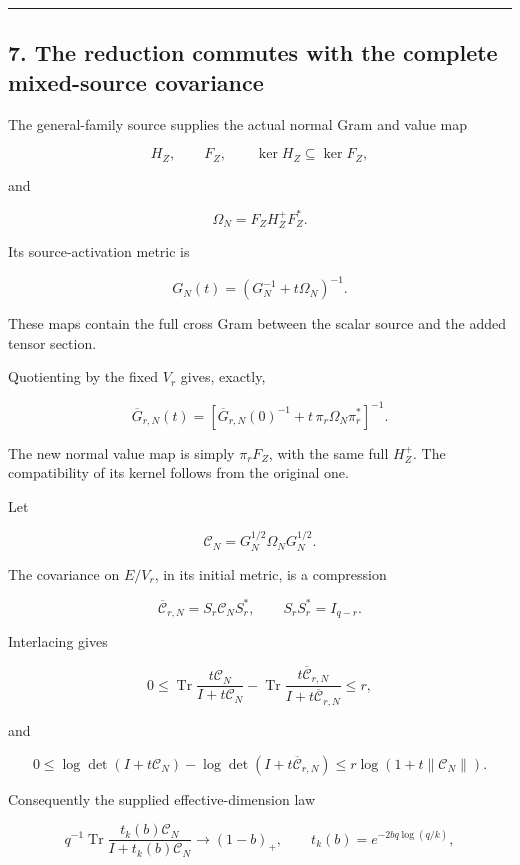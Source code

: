 \documentclass[11pt]{article}
\begin{document}
\begin{center}\rule{0.5\linewidth}{0.5pt}\end{center}

\subsection{7. The reduction commutes with the complete mixed-source covariance}\label{the-reduction-commutes-with-the-complete-mixed-source-covariance}

The general-family source supplies the actual normal Gram and value map

\[
H_Z,\qquad F_Z,\qquad
\ker H_Z\subseteq\ker F_Z,
\]

and

\[
\Omega_N=F_ZH_Z^+F_Z^*.
\]

Its source-activation metric is

\[
G_N(t)=(G_N^{-1}+t\Omega_N)^{-1}.
\]

These maps contain the full cross Gram between the scalar source and the added tensor section.

Quotienting by the fixed \(V_r\) gives, exactly,

\[
\boxed{
\overline G_{r,N}(t)
=
\left[
\overline G_{r,N}(0)^{-1}
+t\,\pi_r\Omega_N\pi_r^*
\right]^{-1}.
}
\tag{45}
\]

The new normal value map is simply \(\pi_rF_Z\), with the same full \(H_Z^+\). The compatibility of its kernel follows from the original one.

Let

\[
\mathcal C_N=G_N^{1/2}\Omega_NG_N^{1/2}.
\]

The covariance on \(E/V_r\), in its initial metric, is a compression

\[
\overline{\mathcal C}_{r,N}=S_r\mathcal C_NS_r^*,
\qquad S_rS_r^*=I_{q-r}.
\]

Interlacing gives

\[
\boxed{
0\le
\operatorname{Tr}\frac{t\mathcal C_N}{I+t\mathcal C_N}
-
\operatorname{Tr}\frac{t\overline{\mathcal C}_{r,N}}
{I+t\overline{\mathcal C}_{r,N}}
\le r,
}
\tag{46}
\]

and

\[
\boxed{
0\le
\log\det(I+t\mathcal C_N)
-\log\det(I+t\overline{\mathcal C}_{r,N})
\le r\log(1+t\|\mathcal C_N\|).
}
\tag{47}
\]

Consequently the supplied effective-dimension law

\[
q^{-1}\operatorname{Tr}
\frac{t_k(b)\mathcal C_N}{I+t_k(b)\mathcal C_N}
\longrightarrow(1-b)_+,
\qquad
t_k(b)=e^{-2bq\log(q/k)},
\]
\end{document}
